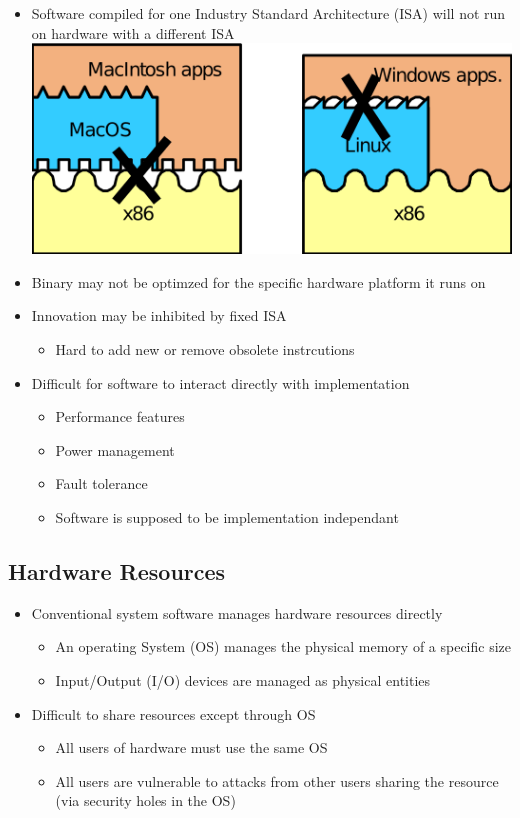 \documentclass{scrartcl}
\begin{document}
\begin{itemize}
	\item Software compiled for one Industry Standard Architecture (ISA) will not run on hardware with a different ISA \\
	
	\includegraphics[width=.6\textwidth]{figures/StandardInterfacesDisadvantages.png}
	\item Binary may not be optimzed for the specific hardware platform it runs on
	\item Innovation may be inhibited by fixed ISA
	\begin{itemize}
		\item Hard to add new or remove obsolete instrcutions
	\end{itemize}
	\item Difficult for software to interact directly with implementation
	\begin{itemize}
		\item Performance features
		\item Power management
		\item Fault tolerance
		\item Software is supposed to be implementation independant
	\end{itemize}
\end{itemize}

\subsection{Hardware Resources}

\begin{itemize}
	\item Conventional system software manages hardware resources directly
	\begin{itemize}
		\item An operating System (OS) manages the physical memory of a specific size
		\item Input/Output (I/O) devices are managed as physical entities
	\end{itemize}
	\item Difficult to share resources except through OS
	\begin{itemize}
		\item All users of hardware must use the same OS
		\item All users are vulnerable to attacks from other users sharing the resource (via security holes in the OS)
	\end{itemize}
\end{itemize}
\end{document}
